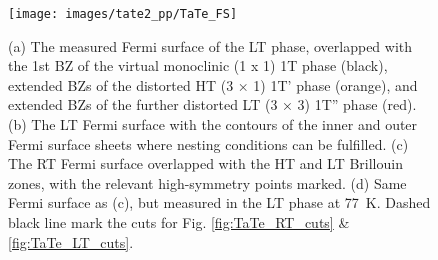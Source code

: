 \begin{figure}[t!]
	\centering
	\texttt{[image: images/tate2\_pp/TaTe\_FS]}
	\caption{(a) The measured Fermi surface of the LT phase, overlapped with the 1st BZ of the virtual monoclinic (1 x 1) 1T phase (black), extended BZs of the distorted HT (3 × 1) 1T' phase (orange), and extended BZs of the further distorted LT (3 × 3) 1T'' phase (red). (b) The LT Fermi surface with the contours of the inner and outer Fermi surface sheets where nesting conditions can be fulfilled. (c) The RT Fermi surface overlapped with the HT and LT Brillouin zones, with the relevant high-symmetry points marked. (d) Same Fermi surface as (c), but measured in the LT phase at \qty{77}{\kelvin}. Dashed black line mark the cuts for Fig. \ref{fig:TaTe_RT_cuts} \& \ref{fig:TaTe_LT_cuts}.}
	\label{fig:TaTe_FS}
\end{figure}


